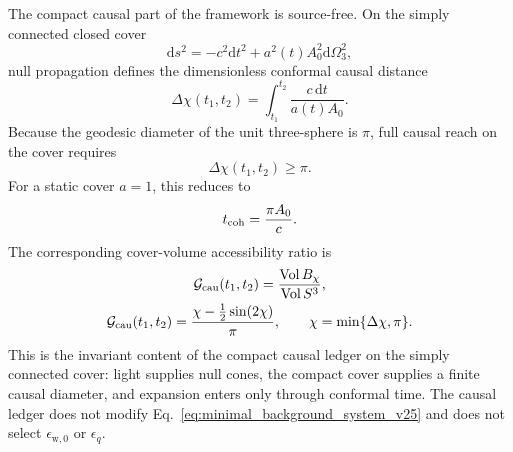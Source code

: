 \documentclass[
  aps,
  prd,
  reprint,
  superscriptaddress,
  floatfix,
  nofootinbib,
  longbibliography
]{revtex4-2}
\theoremstyle{plain}
\theoremstyle{definition}
\theoremstyle{remark}
\newcommand{\dd}{\mathrm d}
\newcommand{\wind}{\mathrm w}
\DeclareMathOperator{\Vol}{Vol}
\newcommand{\eps}{\epsilon}
\begin{document}
The compact causal part of the framework is source-free.  On the simply
connected closed cover
\begin{equation}
\dd s^2=-c^2\dd t^2+a^2(t)A_0^2\dd\Omega_3^2,
\label{eq:causal_closed_metric_v25}
\end{equation}
null propagation defines the dimensionless conformal causal distance
\begin{equation}
\Delta\chi(t_1,t_2)=\int_{t_1}^{t_2}\frac{c\,\dd t}{a(t)A_0}.
\label{eq:delta_chi_v25}
\end{equation}
Because the geodesic diameter of the unit three-sphere is \(\pi\), full causal
reach on the cover requires
\begin{equation}
\Delta\chi(t_1,t_2)\ge\pi .
\label{eq:full_causal_reach_v25}
\end{equation}
For a static cover \(a=1\), this reduces to
\begin{equation}
t_{\rm coh}=\frac{\pi A_0}{c}.
\label{eq:static_coherence_time_v25}
\end{equation}
The corresponding cover-volume accessibility ratio is
\begin{equation}
\begin{gathered}
\mathcal G_{\rm cau}(t_1,t_2)=\frac{\Vol B_{\chi}}{\Vol S^3},\\
\mathcal G_{\rm cau}(t_1,t_2)=
\frac{\chi-\frac12\sin(2\chi)}{\pi},
\qquad
\chi=\min\{\Delta\chi,\pi\}.
\end{gathered}
\label{eq:causal_access_ratio_v25}
\end{equation}
This is the invariant content of the compact causal ledger on the simply
connected cover: light supplies null cones, the compact cover supplies a finite
causal diameter, and expansion enters only through conformal time.  The causal
ledger does not modify Eq.~\eqref{eq:minimal_background_system_v25} and does not
select \(\eps_{\wind,0}\) or \(\eps_q\).
\end{document}
